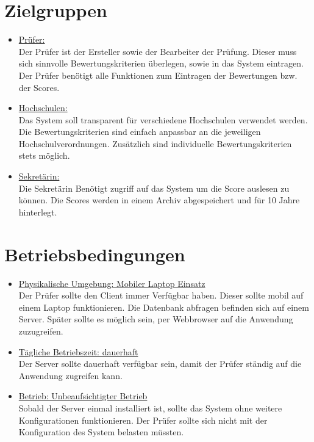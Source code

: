\documentclass[a4paper,listof=leveldown,listof=numbered]{scrreprt}
\begin{document}
	\section{Zielgruppen}
	\begin{itemize}
		\item \underline{Prüfer:}\\
	Der Prüfer ist der Ersteller sowie der Bearbeiter der Prüfung. Dieser muss sich sinnvolle Bewertungskriterien überlegen, sowie in das System eintragen. Der Prüfer benötigt alle Funktionen zum Eintragen der Bewertungen bzw. der Scores.
	
		\item \underline{Hochschulen:}\\
	Das System soll transparent für verschiedene Hochschulen verwendet werden.  Die Bewertungskriterien sind einfach anpassbar an die jeweiligen Hochschulverordnungen. Zusätzlich sind individuelle Bewertungskriterien stets möglich.
			
		\item \underline{Sekretärin:}\\
	Die Sekretärin Benötigt zugriff auf das System um die Score auslesen zu können. Die Scores werden in einem Archiv abgespeichert und für 10 Jahre hinterlegt. 	
		
	\end{itemize}

	\section{Betriebsbedingungen}
	\begin{itemize}
	\item \underline{Physikalische Umgebung: Mobiler Laptop Einsatz} \\
	Der Prüfer sollte den Client immer Verfügbar haben. Dieser sollte mobil auf einem Laptop funktionieren. Die Datenbank abfragen befinden sich auf einem Server. Später sollte es möglich sein, per Webbrowser auf die Anwendung zuzugreifen.
	
	\item \underline{Tägliche Betriebszeit: dauerhaft} \\
	Der Server sollte dauerhaft verfügbar sein, damit der Prüfer ständig auf die Anwendung zugreifen kann. 
	
	\item \underline{Betrieb: Unbeaufsichtigter Betrieb} \\
	Sobald der Server einmal installiert ist, sollte das System ohne weitere Konfigurationen funktionieren. Der Prüfer sollte sich nicht mit der Konfiguration des System belasten müssten. 
	
	\end{itemize}
	
\end{document}
